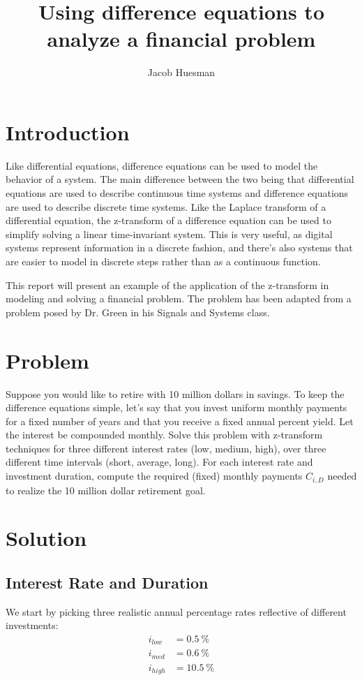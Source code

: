 \documentclass[letterpaper]{article}
\author{Jacob Huesman}
\title{Using difference equations to analyze a financial problem}
\begin{document}
\maketitle


\section{Introduction}
Like differential equations, difference equations can be used to model the behavior of a system. The main difference between the two being that differential equations are used to describe continuous time systems and difference equations are used to describe discrete time systems. Like the Laplace transform of a differential equation, the z-transform of a difference equation can be used to simplify solving a linear time-invariant system. This is very useful, as digital systems represent information in a discrete fashion, and there's also systems that are easier to model in discrete steps rather than as a continuous function.

This report will present an example of the application of the z-transform in modeling and solving a financial problem. The problem has been adapted from a problem posed by Dr. Green in his Signals and Systems class.

\section{Problem}
Suppose you would like to retire with 10 million dollars in savings. To keep the difference equations simple, let's say that you invest uniform monthly payments for a fixed number of years and that you receive a fixed annual percent yield. Let the interest be compounded monthly. Solve this problem with z-transform techniques for three different interest rates (low, medium, high), over three different time intervals (short, average, long). For each interest rate and investment duration, compute the required (fixed) monthly payments $C_{i,D}$ needed to realize the 10 million dollar retirement goal.

\section{Solution}
\subsection{Interest Rate and Duration}
We start by picking three realistic annual percentage rates reflective of different investments:
\begin{align}
	i_{low}  &= \SI{0.5}{\%}  \\
	i_{med}  &= \SI{0.6}{\%}  \\
	i_{high} &= \SI{10.5}{\%}
\end{align}
\end{document}
